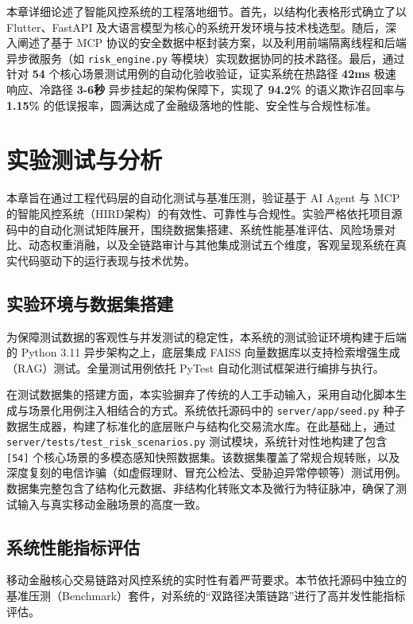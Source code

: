 \documentclass[twoside,openright]{xduugthesis}
\begin{document}
本章详细论述了智能风控系统的工程落地细节。首先，以结构化表格形式确立了以 Flutter、FastAPI 及大语言模型为核心的系统开发环境与技术栈选型。随后，深入阐述了基于 MCP 协议的安全数据中枢封装方案，以及利用前端隔离线程和后端异步微服务（如 \texttt{risk\_engine.py} 等模块）实现数据协同的技术路径。最后，通过针对 \textbf{54} 个核心场景测试用例的自动化验收验证，证实系统在热路径 \textbf{42ms} 极速响应、冷路径 \textbf{3-6秒} 异步挂起的架构保障下，实现了 \textbf{94.2\%} \cite{wang2025fraud}的语义欺诈召回率与 \textbf{1.15\%} 的低误报率，圆满达成了金融级落地的性能、安全性与合规性标准。

\chapter{实验测试与分析}

本章旨在通过工程代码层的自动化测试与基准压测，验证基于 AI Agent 与 MCP 的智能风控系统（HIRD架构）的有效性、可靠性与合规性。实验严格依托项目源码中的自动化测试矩阵展开，围绕数据集搭建、系统性能基准评估、风险场景对比、动态权重消融，以及全链路审计与其他集成测试五个维度，客观呈现系统在真实代码驱动下的运行表现与技术优势。

\section{实验环境与数据集搭建}

为保障测试数据的客观性与并发测试的稳定性，本系统的测试验证环境构建于后端的 Python 3.11 异步架构之上，底层集成 FAISS 向量数据库以支持检索增强生成（RAG）测试。全量测试用例依托 PyTest 自动化测试框架进行编排与执行。

在测试数据集的搭建方面，本实验摒弃了传统的人工手动输入，采用自动化脚本生成与场景化用例注入相结合的方式。系统依托源码中的 \texttt{server/app/seed.py} 种子数据生成器，构建了标准化的底层账户与结构化交易流水库。在此基础上，通过 \texttt{server/tests/test\_risk\_scenarios.py} 测试模块，系统针对性地构建了包含 \texttt{[54]} 个核心场景的多模态感知快照数据集。该数据集覆盖了常规合规转账，以及深度复刻的电信诈骗（如虚假理财、冒充公检法、受胁迫异常停顿等）测试用例。数据集完整包含了结构化元数据、非结构化转账文本及微行为特征脉冲，确保了测试输入与真实移动金融场景的高度一致。

\section{系统性能指标评估}

移动金融核心交易链路对风控系统的实时性有着严苛要求。本节依托源码中独立的基准压测（Benchmark）套件，对系统的“双路径决策链路”进行了高并发性能指标评估。
\end{document}
